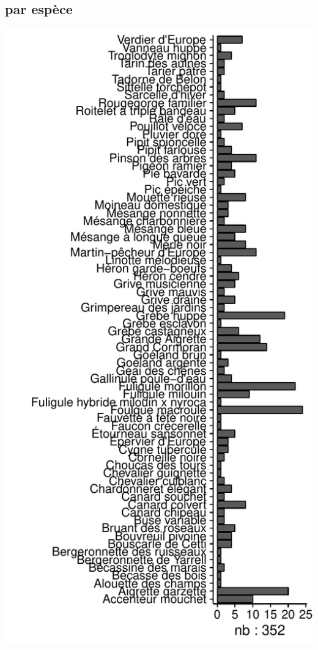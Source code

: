 \subsection*{par espèce}
\includegraphics[width=\malargeurgraphique]{images/faune_stat_champ_NAME_SPECIES.pdf}
